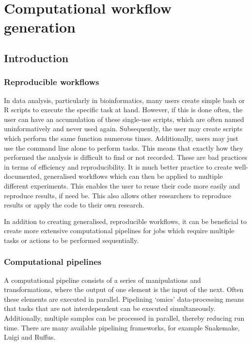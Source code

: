 \chapter{\label{ch:4-Pipelines}Computational workflow generation}


\section{Introduction}

\subsection{Reproducible workflows}
In data analysis, particularly in bioinformatics, many users create simple bash or R scripts to execute the specific task at hand.
However, if this is done often, the user can have an accumulation of these single-use scripts, which are often named uninformatively and never used again.
Subsequently, the user may create scripts which perform the same function numerous times.
Additionally, users may just use the command line alone to perform tasks.
This means that exactly how they performed the analysis is difficult to find or not recorded.
These are bad practices in terms of efficiency and reproducibility.
It is much better practice to create well-documented, generalised workflows which can then be applied to multiple different experiments.
This enables the user to reuse their code more easily and reproduce results, if need be.
This also allows other researchers to reproduce results or apply the code to their own research.

In addition to creating generalised, reproducible workflows, it can be beneficial to create more extensive computational pipelines for jobs which require multiple tasks or actions to be performed sequentially.

\subsection{Computational pipelines}\label{subsec:computational_pipelines}
A computational pipeline consists of a series of manipulations and transformations, where the output of one element is the input of the next.
Often these elements are executed in parallel.
Pipelining `omics' data-processing means that tasks that are not interdependent can be executed simultaneously.
Additionally, multiple samples can be processed in parallel, thereby reducing run time.
There are many available pipelining frameworks, for example Snakemake\cite{koster2012snakemake}, Luigi and Ruffus\cite{goodstadt2010ruffus}.

